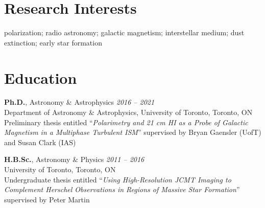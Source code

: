 \documentclass[10pt]{res} %
\begin{document}
\begin{resume}


\section{\Large Research Interests}
\vspace{-5pt} %
\noindent\makebox[\linewidth]{\rule{\textwidth}{0.4pt}}
\vspace{-20pt} %

polarization; radio astronomy; galactic magnetism; interstellar medium; dust extinction; early star formation




\section{\Large Education}
\vspace{-5pt} %
\noindent\makebox[\linewidth]{\rule{\textwidth}{0.4pt}}
\vspace{-20pt} %

{\bf Ph.D.}, Astronomy \& Astrophysics \hfill \textit{2016 -- 2021} \\
Department of Astronomy \& Astrophysics, University of Toronto, Toronto, ON \\
Preliminary thesis entitled ``\textit{Polarimetry and 21 cm HI as a Probe of Galactic Magnetism in a Multiphase Turbulent ISM}'' supervised by Bryan Gaensler (UofT) and Susan Clark (IAS)

{\bf H.B.Sc.}, Astronomy \& Physics \hfill \textit{2011 -- 2016} \\ 
University of Toronto, Toronto, ON \\ 
Undergraduate thesis entitled ``\textit{Using High-Resolution JCMT Imaging to Complement Herschel Observations in Regions of Massive Star Formation}'' supervised by Peter Martin
 

\end{resume}
\end{document}
